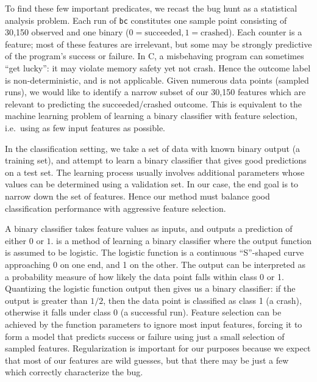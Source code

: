 To find these few important predicates, we recast the bug hunt as a
statistical analysis problem.  Each run of \texttt{bc} constitutes one
sample point consisting of 30,150 observed  and one
binary  ($0 = \text{succeeded}, 1 = \text{crashed}$).
Each counter is a feature; most of these features are irrelevant, but
some may be strongly predictive of the program's success or failure.
In C, a misbehaving program can sometimes ``get lucky'': it may
violate memory safety yet not crash.  Hence the outcome label is
non-deterministic, and 
is not applicable.  Given numerous data points (sampled runs), we
would like to identify a narrow subset of our 30,150 features which
are relevant to predicting the succeeded/crashed outcome.  This is
equivalent to the machine learning problem of learning a binary
classifier with feature selection, i.e.\ using as few input features
as possible.

In the classification setting, we take a set of data with known binary
output (a training set), and attempt to learn a binary classifier that
gives good predictions on a test set.  The learning process usually
involves additional parameters whose values can be determined using a
validation set.  In our case, the end goal is to narrow down the set
of features.  Hence our method must balance good
classification performance with aggressive feature selection.

A binary classifier takes feature values as inputs, and outputs a
prediction of either $0$ or $1$.  
\cite{Hastie01} is a method of learning a binary classifier where the
output function is assumed to be logistic.  The logistic function is a
continuous ``S''-shaped curve approaching 0 on one end, and 1 on the
other.  The output can be interpreted as a probability measure of how
likely the data point falls within class 0 or 1.  Quantizing the
logistic function output then gives us a binary classifier: if the
output is greater than $1/2$, then the data point is classified as
class 1 (a crash), otherwise it falls under class 0 (a successful
run).  Feature selection can be achieved by  the
function parameters to ignore most input features, forcing it to form
a model that predicts success or failure using just a small selection
of sampled features.  Regularization is important for our purposes
because we expect that most of our features are wild guesses, but that
there may be just a few which correctly characterize the bug.

